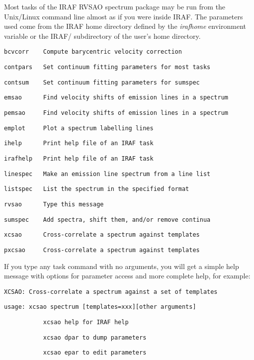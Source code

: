 Most tasks of the IRAF RVSAO spectrum package may be run from the Unix/Linux
command line almost as if you were inside IRAF. The parameters used come from the IRAF
home directory defined by the \textit{irafhome} environment variable or
the IRAF/ subdirectory of the user's home directory.

\texttt{bcvcorr~~~~Compute barycentric velocity correction}

\texttt{contpars~~~Set continuum fitting parameters for most tasks}

\texttt{contsum~~~~Set continuum fitting parameters for sumspec}

\texttt{emsao~~~~~~Find velocity shifts of emission lines in a spectrum}

\texttt{pemsao~~~~~Find velocity shifts of emission lines in a spectrum}

\texttt{emplot~~~~~Plot a spectrum labelling lines}

\texttt{ihelp~~~~~~Print help file of an IRAF task}

\texttt{irafhelp~~~Print help file of an IRAF task}

\texttt{linespec~~~Make an emission line spectrum from a line list}

\texttt{listspec~~~List the spectrum in the specified format}

\texttt{rvsao~~~~~~Type this message}

\texttt{sumspec~~~~Add spectra, shift them, and/or remove continua}

\texttt{xcsao~~~~~~Cross-correlate a spectrum against templates}

\texttt{pxcsao~~~~~Cross-correlate a spectrum against templates}

If you type any task command with no arguments, you will get a simple help
message with options for parameter access and more complete help,
for example:

\texttt{XCSAO: Cross-correlate a spectrum against a set of templates}

\texttt{usage: xcsao spectrum [templates=xxx][other arguments]}

\texttt{~~~~~~~~~~~xcsao help for IRAF help}

\texttt{~~~~~~~~~~~xcsao dpar to dump parameters}

\texttt{~~~~~~~~~~~xcsao epar to edit parameters}

